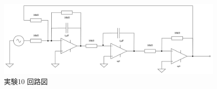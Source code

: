 \begin{figure}[!htb]
	\centering
	\includegraphics[width=0.90\linewidth]{src/figures/exp10/circuit.png}
	\caption{実験10 回路図}\label{fig:exp10-circuit}
\end{figure}

